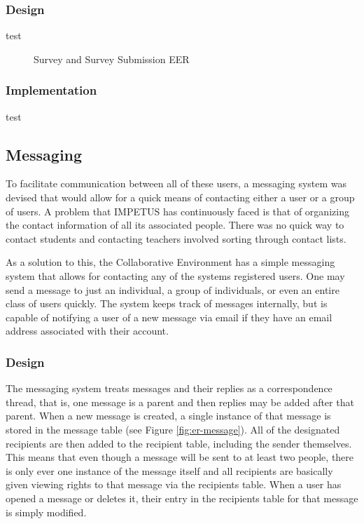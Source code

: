 \subsubsection{Design}
test

\begin{figure}[h!]
	\centering
	\caption{Survey and Survey Submission EER}
	\label{fig:er-survey}
\end{figure}

\subsubsection{Implementation}
test

\subsection{Messaging}
\label{subsec:design-messaging}
To facilitate communication between all of these users, a messaging system was devised that would allow for a quick means of contacting either a user or a group of users. A problem that IMPETUS has continuously faced is that of organizing the contact information of all its associated people. There was no quick way to contact students and contacting teachers involved sorting through contact lists.

As a solution to this, the Collaborative Environment has a simple messaging system that allows for contacting any of the systems registered users. One may send a message to just an individual, a group of individuals, or even an entire class of users quickly. The system keeps track of messages internally, but is capable of notifying a user of a new message via email if they have an email address associated with their account.

\subsubsection{Design}
The messaging system treats messages and their replies as a correspondence thread, that is, one message is a parent and then replies may be added after that parent. When a new message is created, a single instance of that message is stored in the message table (see Figure \ref{fig:er-message}). All of the designated recipients are then added to the recipient table, including the sender themselves. This means that even though a message will be sent to at least two people, there is only ever one instance of the message itself and all recipients are basically given viewing rights to that message via the recipients table. When a user has opened a message or deletes it, their entry in the recipients table for that message is simply modified.


